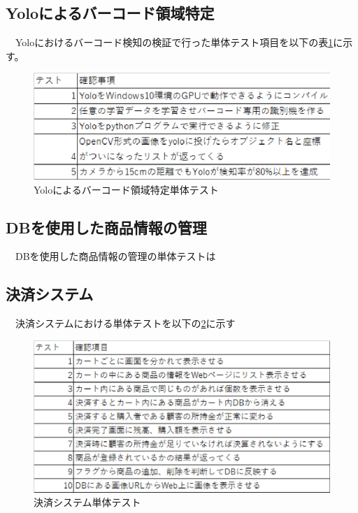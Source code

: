 \subsection*{Yoloによるバーコード領域特定}
　Yoloにおけるバーコード検知の検証で行った単体テスト項目を以下の表\ref{yolo_test}に示す。
\begin{figure}[htbp]
\centering
\includegraphics[width=12cm]{./pic/yolo_test.eps}
\caption{Yoloによるバーコード領域特定単体テスト}
\label{yolo_test}
\end{figure}

\subsection*{DBを使用した商品情報の管理}
　DBを使用した商品情報の管理の単体テストは

\subsection*{決済システム}
　決済システムにおける単体テストを以下の\ref{db_test}に示す
\begin{figure}[htbp]
\centering
\includegraphics[width=12cm]{./pic/db_test.eps}
\caption{決済システム単体テスト}
\label{db_test}
\end{figure}


